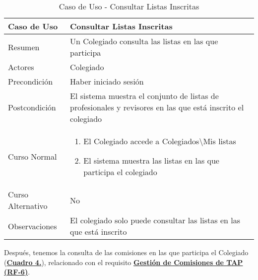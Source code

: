\begin{table}[!htbp]
  \centering  \addtocounter{casouso}{1}
  \begin{tabular}{|l | p{100mm}|}
    \textbf{Caso de Uso}  & \textbf{Consultar Listas Inscritas} \\ \hline
    Resumen 		 & Un Colegiado consulta las listas en las que participa \\ \hline
    Actores  		 & Colegiado \\ \hline
    Precondición  	 & Haber iniciado sesión \\ \hline
    Postcondición  	 & El sistema muestra el conjunto de listas de profesionales y revisores en las que está inscrito el colegiado \\ \hline
    Curso Normal   	 & \begin{enumerate}
	  \item El Colegiado accede a Colegiados\textbackslash Mis listas
	  \item El sistema muestra las listas en las que participa el colegiado
    \end{enumerate}  \\ \hline
    Curso Alternativo  & No  \\ \hline
    Observaciones 	 & El colegiado solo puede consultar las listas en las que está inscrito \\ \hline
  \end{tabular}
  \caption{Caso de Uso  - Consultar Listas Inscritas}
  \label{tab:cucConsultaLista}
\end{table}
\FloatBarrier

\addtocounter{tabla}{1}
Después, tenemos la consulta de las comisiones en las que participa el Colegiado (\textbf{\hyperref[tab:cucConsultaComision]{Cuadro 4.}}), relacionado con el requisito \textbf{\hyperref[tab:rfGestComTAP]{Gestión de Comisiones de TAP (RF-6)}}.

